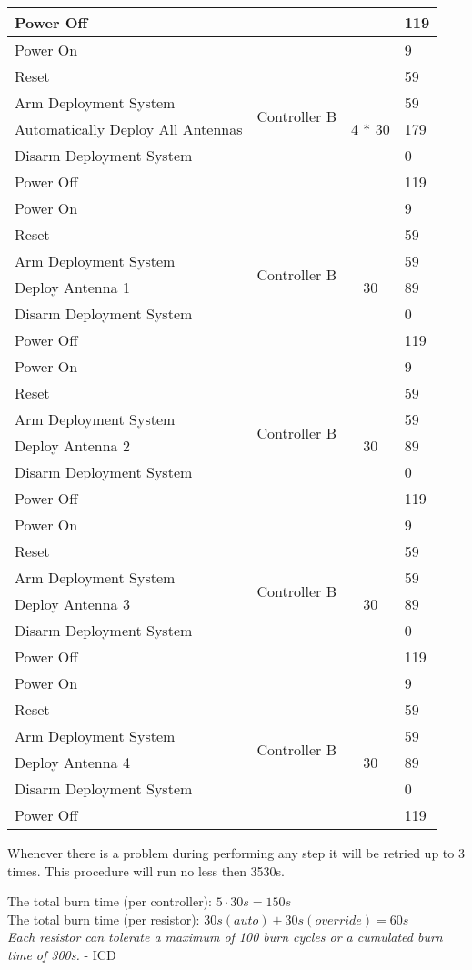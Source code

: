 \begin{longtable}{l|c|c|l}
    Power Off & & & 119 \\
    \hline
    Power On & \multirow{6}{*}{Controller B} & & 9 \\
    Reset &  & & 59 \\
    Arm Deployment System &  & & 59 \\
    Automatically Deploy All Antennas & & 4 * 30 & 179 \\
    Disarm Deployment System &  & & 0 \\
    Power Off & & & 119 \\
    \hline
    Power On & \multirow{6}{*}{Controller B} & & 9 \\
    Reset &  & & 59 \\
    Arm Deployment System &  & & 59 \\
    Deploy Antenna 1 & & 30 & 89 \\
    Disarm Deployment System &  & & 0 \\
    Power Off & & & 119 \\
    \hline
    Power On & \multirow{6}{*}{Controller B} & & 9 \\
    Reset &  & & 59 \\
    Arm Deployment System &  & & 59 \\
    Deploy Antenna 2 & & 30 & 89 \\
    Disarm Deployment System &  & & 0 \\
    Power Off & & & 119 \\
    \hline
    Power On & \multirow{6}{*}{Controller B} & & 9 \\
    Reset &  & & 59 \\
    Arm Deployment System &  & & 59 \\
    Deploy Antenna 3 & & 30 & 89 \\
    Disarm Deployment System &  & & 0 \\
    Power Off & & & 119 \\
    \hline
    Power On & \multirow{6}{*}{Controller B} & & 9 \\
    Reset & & & 59 \\
    Arm Deployment System &  & & 59 \\
    Deploy Antenna 4 & & 30 & 89 \\
    Disarm Deployment System & & & 0 \\
    Power Off & & & 119 \\
    \bottomrule
\end{longtable}

Whenever there is a problem during performing any step it will be retried up to 3 times. This procedure will run no less then 3530s.

The total burn time (per controller): $5 \cdot 30s = 150s$\\
The total burn time (per resistor): $30s (auto) + 30s (override) = 60s$\\
\textit{Each resistor can tolerate a maximum of 100 burn cycles or a cumulated burn time of 300s.} - ICD\textsl{}

